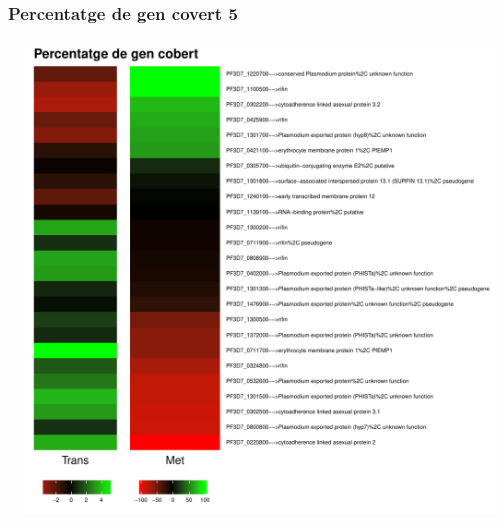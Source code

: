 \documentclass{article}\usepackage[]{graphicx}\usepackage[]{color}
\newenvironment{knitrout}{}{} %
\begin{document}
\subsubsection{Percentatge de gen covert 5}
\begin{knitrout}
\color{fgcolor}

{\centering \includegraphics[width=20cm,height=12.5cm]{figure/minimal-met_percet_5-1} 

}



\end{knitrout}
\clearpage
\end{document}
